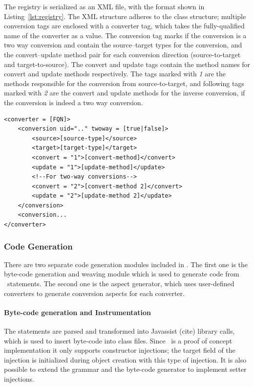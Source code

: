 The registry is serialized as an XML file, with the format shown in Listing~\ref{lst:registry}. 
The XML structure adheres to the class structure; multiple conversion tags are enclosed with a converter tag, which takes the fully-qualified name of the converter as a value. 
The conversion tag marks if the conversion is a two way conversion and contain the source--target types for the conversion, and the convert--update method pair for each conversion direction (source-to-target and target-to-source). 
The convert and update tags contain the method names for convert and update methods respectively. The tags marked with \emph{1} are the methods responsible for the conversion from source-to-target, and following tags marked with \emph{2} are the convert and update methods for the inverse conversion, if the conversion is indeed a two way conversion. 

\begin{lstlisting}[float, language=XMLRegistry, caption={The XML code for a registry item}, label={lst:registry}]
<converter = [FQN]>
	<conversion uid=".." twoway = [true|false]>
		<source>[source-type]</source>
		<target>[target-type]</target>
		<convert = "1">[convert-method]</convert>
		<update = "1">[update-method]</update>
		<!--For two-way conversions-->
		<convert = "2">[convert-method 2]</convert>
		<update = "2">[update-method 2]</update>
	</conversion>
	<conversion...
</converter>
\end{lstlisting}


\subsubsection{Code Generation}
\label{sec:adapter:codegen}
There are two separate code generation modules included in \zamk. The first one is the byte-code generation and weaving module which is used to generate code from \gluer~statements. 
The second one is the aspect generator, which uses user-defined converters to generate conversion aspects for each converter.

\paragraph{Byte-code generation and Instrumentation}
The \gluer statements are parsed and transformed into Javassist (cite) library calls, which is used to insert byte-code into class files. 
Since \gluer~is a proof of concept implementation it only supports constructor injections; the target field of the injection is initialized during object creation with this type of injection.  
It is also possible to extend the grammar and the byte-code generator to implement setter injections. 

